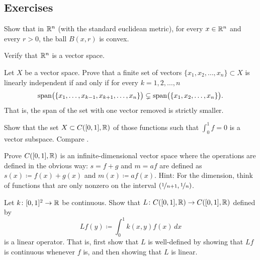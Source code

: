 \subsection{Exercises}

\begin{exercise}
Show that in ${\mathbb{R}}^n$
(with the standard euclidean metric),
for every $x \in {\mathbb{R}}^n$ and every $r > 0$,
the ball $B(x,r)$ is convex.
\end{exercise}


\begin{exercise}
Verify that ${\mathbb{R}}^n$ is a vector space.
\end{exercise}

\begin{exercise}
Let $X$ be a vector space.
Prove that a finite set of vectors $\{ x_1,x_2,\ldots,x_n \} \subset X$ 
is linearly independent if and only if for every $k=1,2,\ldots,n$
\begin{equation*}
\operatorname{span}\bigl( \{ x_1,\ldots,x_{k-1},x_{k+1},\ldots,x_n \}\bigr) \subsetneq
\operatorname{span}\bigl( \{ x_1,x_2,\ldots,x_n \}\bigr) .
\end{equation*}
That is, the span of the set with one vector removed is strictly smaller.
\end{exercise}

\begin{exercise} \label{exercise:intzerosubspace}
Show that the set $X \subset C([0,1],{\mathbb{R}})$ of those functions such 
that $\int_0^1 f = 0$ is a vector subspace.
Compare .
\end{exercise}

\begin{exercise}[Challenging]
Prove $C([0,1],{\mathbb{R}})$ is an infinite-dimensional vector space
where the operations are defined in the obvious way:
$s=f+g$ and $m=af$ are defined as
$s(x) \coloneqq f(x)+g(x)$ and
$m(x) \coloneqq a f(x)$.
Hint: For the dimension, think of functions that are only nonzero
on the interval $(\nicefrac{1}{n+1},\nicefrac{1}{n})$.
\end{exercise}

\begin{exercise} \label{exercise:continuouskernel}
Let $k \colon [0,1]^2 \to {\mathbb{R}}$ be continuous.  Show that
$L \colon C([0,1],{\mathbb{R}}) \to C([0,1],{\mathbb{R}})$ defined by
\begin{equation*}
Lf(y) \coloneqq \int_0^1 k(x,y)f(x)\,dx
\end{equation*}
is a linear operator.  That is, first show that $L$ is well-defined by
showing that $Lf$ is continuous whenever $f$ is, and
then showing that $L$ is linear.
\end{exercise}

